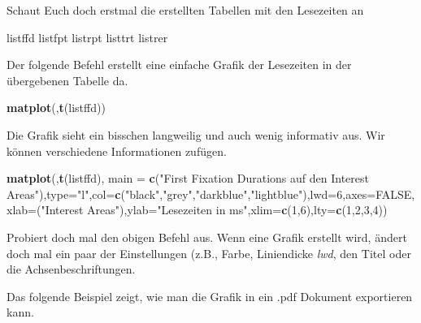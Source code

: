\documentclass[]{book}
\newenvironment{Shaded}{\begin{snugshade}}{\end{snugshade}}
\newcommand{\KeywordTok}[1]{\textcolor[rgb]{0.13,0.29,0.53}{\textbf{#1}}}
\newcommand{\DataTypeTok}[1]{\textcolor[rgb]{0.13,0.29,0.53}{#1}}
\newcommand{\DecValTok}[1]{\textcolor[rgb]{0.00,0.00,0.81}{#1}}
\newcommand{\StringTok}[1]{\textcolor[rgb]{0.31,0.60,0.02}{#1}}
\newcommand{\OtherTok}[1]{\textcolor[rgb]{0.56,0.35,0.01}{#1}}
\newcommand{\NormalTok}[1]{#1}
\begin{document}
Schaut Euch doch erstmal die erstellten Tabellen mit den Lesezeiten an

\begin{Shaded}
\begin{Highlighting}[]
\NormalTok{listffd}
\NormalTok{listfpt}
\NormalTok{listrpt}
\NormalTok{listtrt}
\NormalTok{listrer}
\end{Highlighting}
\end{Shaded}

Der folgende Befehl erstellt eine einfache Grafik der Lesezeiten in der
übergebenen Tabelle da.

\begin{Shaded}
\begin{Highlighting}[]
\KeywordTok{matplot}\NormalTok{(,}\KeywordTok{t}\NormalTok{(listffd))}
\end{Highlighting}
\end{Shaded}

Die Grafik sieht ein bisschen langweilig und auch wenig informativ aus.
Wir können verschiedene Informationen zufügen.

\begin{Shaded}
\begin{Highlighting}[]
\KeywordTok{matplot}\NormalTok{(,}\KeywordTok{t}\NormalTok{(listffd), }\DataTypeTok{main =} \KeywordTok{c}\NormalTok{(}\StringTok{"First Fixation Durations auf den Interest Areas"}\NormalTok{),}\DataTypeTok{type=}\StringTok{"l"}\NormalTok{,}\DataTypeTok{col=}\KeywordTok{c}\NormalTok{(}\StringTok{"black"}\NormalTok{,}\StringTok{"grey"}\NormalTok{,}\StringTok{"darkblue"}\NormalTok{,}\StringTok{"lightblue"}\NormalTok{),}\DataTypeTok{lwd=}\DecValTok{6}\NormalTok{,}\DataTypeTok{axes=}\OtherTok{FALSE}\NormalTok{,}\DataTypeTok{xlab=}\NormalTok{(}\StringTok{"Interest Areas"}\NormalTok{),}\DataTypeTok{ylab=}\StringTok{"Lesezeiten in ms"}\NormalTok{,}\DataTypeTok{xlim=}\KeywordTok{c}\NormalTok{(}\DecValTok{1}\NormalTok{,}\DecValTok{6}\NormalTok{),}\DataTypeTok{lty=}\KeywordTok{c}\NormalTok{(}\DecValTok{1}\NormalTok{,}\DecValTok{2}\NormalTok{,}\DecValTok{3}\NormalTok{,}\DecValTok{4}\NormalTok{))}
\end{Highlighting}
\end{Shaded}

Probiert doch mal den obigen Befehl aus. Wenn eine Grafik erstellt wird,
ändert doch mal ein paar der Einstellungen (z.B., Farbe, Liniendicke
\emph{lwd}, den Titel oder die Achsenbeschriftungen.

Das folgende Beispiel zeigt, wie man die Grafik in ein .pdf Dokument
exportieren kann.
\end{document}
